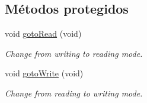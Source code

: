 \subsection*{\-Métodos protegidos}
\begin{DoxyCompactItemize}
\item 
\hypertarget{classxsens_1_1Cmt1f_a06211472647b5865767127ce404713bf}{void \hyperlink{classxsens_1_1Cmt1f_a06211472647b5865767127ce404713bf}{goto\-Read} (void)}\label{classxsens_1_1Cmt1f_a06211472647b5865767127ce404713bf}

\begin{DoxyCompactList}\small\item\em \-Change from writing to reading mode. \end{DoxyCompactList}\item 
\hypertarget{classxsens_1_1Cmt1f_a70655b6aa0207f32b9bb89e0bfbeda07}{void \hyperlink{classxsens_1_1Cmt1f_a70655b6aa0207f32b9bb89e0bfbeda07}{goto\-Write} (void)}\label{classxsens_1_1Cmt1f_a70655b6aa0207f32b9bb89e0bfbeda07}

\begin{DoxyCompactList}\small\item\em \-Change from reading to writing mode. \end{DoxyCompactList}\end{DoxyCompactItemize}

